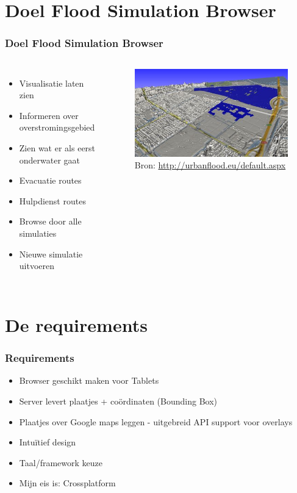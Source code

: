 \documentclass[10pt,a4paper]{beamer}
\begin{document}
\section{Doel Flood Simulation Browser}
\begin{frame}
\frametitle{Doel Flood Simulation Browser}
\begin{columns}[c]
\column{5cm}
\begin{itemize}
\item Visualisatie laten zien
\item Informeren over overstromingsgebied
\item Zien wat er als eerst onderwater gaat
\item Evacuatie routes
\item Hulpdienst routes
\item Browse door alle simulaties
\item Nieuwe simulatie uitvoeren
\end{itemize}
\column{5cm}
\begin{figure}
\includegraphics[scale=0.5]{simulation.png}
\caption{Bron: \url{http://urbanflood.eu/default.aspx}}
\end{figure}
\end{columns}
\end{frame}
\section{De requirements}
\begin{frame}
\frametitle{Requirements}
\begin{itemize}
\item Browser geschikt maken voor Tablets
\item Server levert plaatjes + coördinaten (Bounding Box)
\item Plaatjes over Google maps leggen - uitgebreid API support voor overlays
\item Intuïtief design
\item Taal/framework keuze
\item Mijn eis is: Crossplatform
\end{itemize}
\end{frame}
\end{document}
